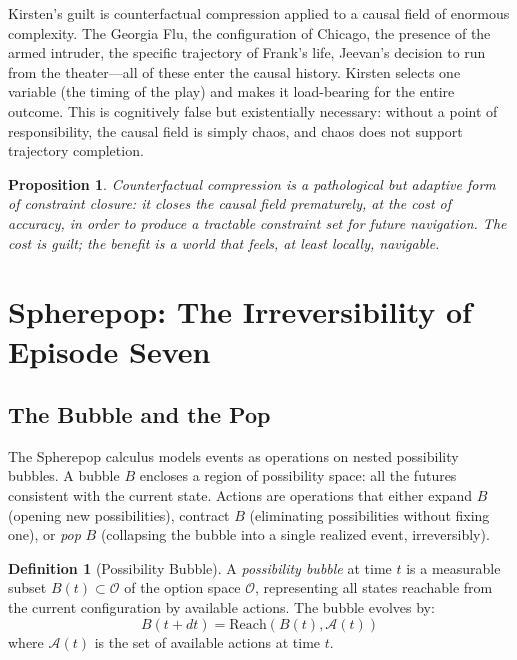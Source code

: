 \documentclass[12pt, oneside]{article}
\theoremstyle{plain}
\newtheorem{proposition}[theorem]{Proposition}
\theoremstyle{definition}
\newtheorem{definition}[theorem]{Definition}
\theoremstyle{remark}
\newcommand{\Opt}{\mathcal{O}}
\begin{document}
Kirsten's guilt is counterfactual compression applied to a causal
field of enormous complexity. The Georgia Flu, the configuration
of Chicago, the presence of the armed intruder, the specific
trajectory of Frank's life, Jeevan's decision to run from the
theater---all of these enter the causal history. Kirsten selects
one variable (the timing of the play) and makes it load-bearing
for the entire outcome. This is cognitively false but existentially
necessary: without a point of responsibility, the causal field
is simply chaos, and chaos does not support trajectory completion.

\begin{proposition}
Counterfactual compression is a pathological but adaptive form of
constraint closure: it closes the causal field prematurely, at the
cost of accuracy, in order to produce a tractable constraint set for
future navigation. The cost is guilt; the benefit is a world that
feels, at least locally, navigable.
\end{proposition}

\section{Spherepop: The Irreversibility of Episode Seven}

\subsection{The Bubble and the Pop}

The Spherepop calculus models events as operations on nested
possibility bubbles. A bubble $B$ encloses a region of possibility
space: all the futures consistent with the current state. Actions
are operations that either expand $B$ (opening new possibilities),
contract $B$ (eliminating possibilities without fixing one), or
\emph{pop} $B$ (collapsing the bubble into a single realized event,
irreversibly).

\begin{definition}[Possibility Bubble]
A \emph{possibility bubble} at time $t$ is a measurable subset
$B(t) \subset \Opt$ of the option space $\Opt$, representing all
states reachable from the current configuration by available actions.
The bubble evolves by:
\[
  B(t + dt) = \mathrm{Reach}(B(t), \mathcal{A}(t))
\]
where $\mathcal{A}(t)$ is the set of available actions at time $t$.
\end{definition}
\end{document}

